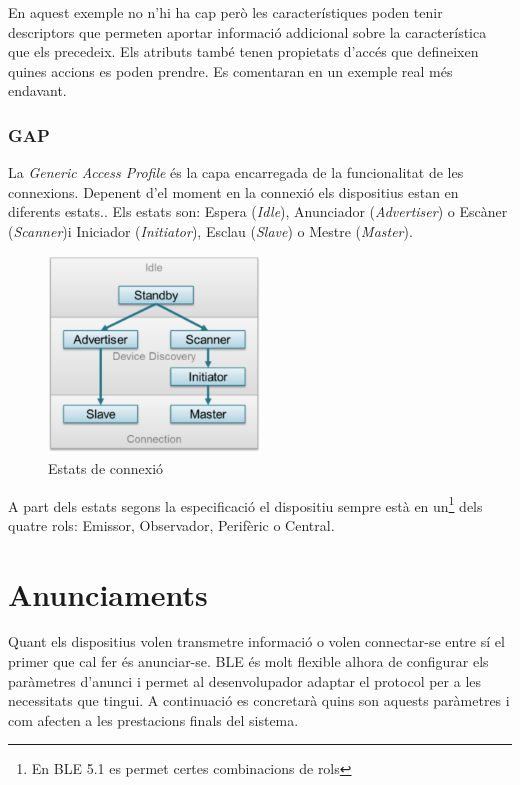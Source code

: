 En aquest exemple no n'hi ha cap però les característiques poden tenir descriptors \cite{descriptors} que permeten aportar informació addicional sobre la característica que els precedeix.
Els atributs també tenen propietats d'accés que defineixen quines accions es poden prendre.
Es comentaran en un exemple real més endavant. %

\subsubsection{GAP}
La \textit{Generic Access Profile} és la capa encarregada de la funcionalitat de les connexions.
Depenent d'el moment en la connexió els dispositius estan en diferents estats..
Els estats son: Espera (\textit{Idle}), Anunciador (\textit{Advertiser}) o Escàner (\textit{Scanner})i Iniciador (\textit{Initiator}), Esclau (\textit{Slave}) o Mestre (\textit{Master}).

\begin{figure}[!h]
	\begin{center}
		\includegraphics[width=0.5\textwidth]{./images/gap_state_diagram.png}
		\caption{Estats de connexió}
	\end{center}
\end{figure}

A part dels estats segons la especificació el dispositiu sempre està en un\footnote{En BLE 5.1 es permet certes combinacions de rols} dels quatre rols: Emissor, Observador, Perifèric o Central.

\section{Anunciaments}
Quant els dispositius volen transmetre informació o volen connectar-se entre sí el primer que cal fer és anunciar-se.
BLE és molt flexible alhora de configurar els paràmetres d'anunci i permet al desenvolupador adaptar el protocol per a les necessitats que tingui.
A continuació es concretarà quins son aquests paràmetres i com afecten a les prestacions finals del sistema.

